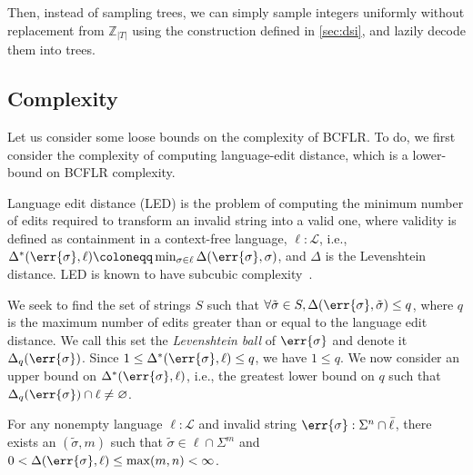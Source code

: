 \documentclass[runningheads]{llncs}
\begin{document}
Then, instead of sampling trees, we can simply sample integers uniformly without replacement from $\mathbb{Z}_{|T|}$ using the construction defined in \ref{sec:dsi}, and lazily decode them into trees.

\subsection{Complexity}

Let us consider some loose bounds on the complexity of BCFLR. To do, we first consider the complexity of computing language-edit distance, which is a lower-bound on BCFLR complexity.

\begin{definition}
  Language edit distance (LED) is the problem of computing the minimum number of edits required to transform an invalid string into a valid one, where validity is defined as containment in a context-free language, $\ell: \mathcal{L}$, i.e., $\Delta^*(\err{\sigma}, \ell) \coloneqq \min_{\sigma \in \ell}\Delta(\err{\sigma}, \sigma)$, and $\Delta$ is the Levenshtein distance. LED is known to have subcubic complexity~\cite{bringmann2019truly}.
\end{definition}

We seek to find the set of strings $S$ such that $\forall \tilde{\sigma}\in S, \Delta(\err{\sigma}, \tilde{\sigma}) \leq q$, where $q$ is the maximum number of edits greater than or equal to the language edit distance. We call this set the \textit{Levenshtein ball} of $\err{\sigma}$ and denote it $\Delta_q(\err{\sigma})$. Since $1 \leq \Delta^*(\err{\sigma}, \ell) \leq q$, we have $1 \leq q$. We now consider an upper bound on $\Delta^*(\err{\sigma}, \ell)$, i.e., the greatest lower bound on $q$ such that $\Delta_q(\err{\sigma}) \cap \ell \neq \varnothing$.

\begin{lemma}\label{lemma:upper-bound}
For any nonempty language $\ell: \mathcal{L}$ and invalid string $\err{\sigma}: \Sigma^n \cap \bar\ell$, there exists an $(\tilde{\sigma}, m)$ such that $\tilde{\sigma} \in \ell\cap\Sigma^m$ and $0 < \Delta(\err{\sigma}, \ell) \leq \max(m, n) < \infty$.
\end{lemma}
\end{document}
